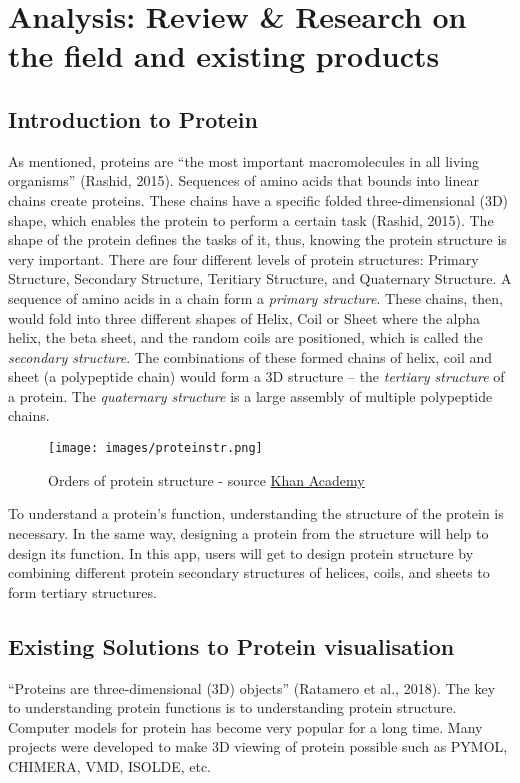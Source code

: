 \chapter{Analysis: Review \& Research on the field and existing products}
\label{ch:litRev}

\section{Introduction to Protein}

As mentioned, proteins are “the most important macromolecules in all living organisms” (Rashid, 2015). Sequences of amino acids that bounds into linear chains create proteins. These chains have a specific folded three-dimensional (3D) shape, which enables the protein to perform a certain task (Rashid, 2015). The shape of the protein defines the tasks of it, thus, knowing the protein structure is very important. There are four different levels of protein structures: Primary Structure, Secondary Structure, Teritiary Structure, and Quaternary Structure. A sequence of amino acids in a chain form a \emph{primary structure}. These chains, then, would fold into three different shapes of Helix, Coil or Sheet where the alpha helix, the beta sheet, and the random coils are positioned, which is called the \emph{secondary structure}. The combinations of these formed chains of helix, coil and sheet (a polypeptide chain) would form a 3D structure – the \emph{tertiary structure} of a protein. The \emph{quaternary structure} is a large assembly of multiple polypeptide chains.
 \begin{figure}[!htp]
	\centering
	\texttt{[image: images/proteinstr.png]}
	\caption{Orders of protein structure - source \href{https://www.khanacademy.org/science/biology/macromolecules/proteins-and-amino-acids/a/orders-of-protein-structure}{Khan Academy}}
	\label{fig:proteinstr}
\end{figure}

To understand a protein’s function, understanding the structure of the protein is necessary. In the same way, designing a protein from the structure will help to design its function. 
In this app, users will get to design protein structure by combining different protein secondary structures of helices, coils, and sheets to form tertiary structures. 


\section{Existing Solutions to Protein visualisation}
 “Proteins are three-dimensional (3D) objects” (Ratamero et al., 2018). The key to understanding protein functions is to understanding protein structure. Computer models for protein has become very popular for a long time. Many projects were developed to make 3D viewing of protein possible such as PYMOL, CHIMERA, VMD, ISOLDE, etc. 
 
